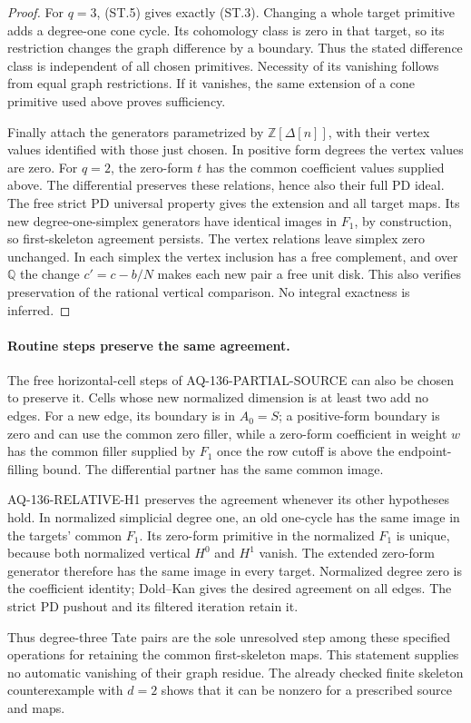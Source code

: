 \begin{proof}
For \(q=3\), (ST.5) gives exactly (ST.3). Changing a whole
target primitive adds a degree-one cone cycle. Its cohomology
class is zero in that target, so its restriction changes the
graph difference by a boundary. Thus the stated difference
class is independent of all chosen primitives. Necessity of
its vanishing follows from equal graph restrictions. If it
vanishes, the same extension of a cone primitive used above
proves sufficiency.

Finally attach the generators parametrized by \(\mathbb Z[\Delta[n]]\),
with their vertex values identified with those just chosen.
In positive form degrees the vertex values are zero. For
\(q=2\), the zero-form \(t\) has the common coefficient
values supplied above. The differential preserves these
relations, hence also their full PD ideal. The free strict PD
universal property gives the extension and all target maps.
Its new degree-one-simplex generators have identical images in
\(F_1\), by construction, so first-skeleton agreement persists.
The vertex relations leave simplex zero unchanged. In each
simplex the vertex inclusion has a free complement, and over
\(\mathbb Q\) the change \(c'=c-b/N\) makes each new pair
a free unit disk. This also verifies preservation of the
rational vertical comparison. No integral exactness is inferred.
\end{proof}

\paragraph{Routine steps preserve the same agreement.}
The free horizontal-cell steps of AQ-136-PARTIAL-SOURCE can
also be chosen to preserve it. Cells whose new normalized
dimension is at least two add no edges. For a new edge, its
boundary is in \(A_0=S\); a positive-form boundary is zero
and can use the common zero filler, while a zero-form coefficient
in weight \(w\) has the common filler supplied by \(F_1\)
once the row cutoff is above the endpoint-filling bound.
The differential partner has the same common image.

AQ-136-RELATIVE-H1 preserves the agreement whenever its other
hypotheses hold. In normalized simplicial degree one, an old
one-cycle has the same image in the targets' common \(F_1\).
Its zero-form primitive in the normalized \(F_1\) is unique,
because both normalized vertical \(H^0\) and \(H^1\) vanish.
The extended zero-form generator therefore has the same image
in every target. Normalized degree zero is the coefficient
identity; Dold--Kan gives the desired agreement on all edges.
The strict PD pushout and its filtered iteration retain it.

Thus degree-three Tate pairs are the sole unresolved step
among these specified operations for retaining the common
first-skeleton maps. This statement supplies no automatic
vanishing of their graph residue. The already checked finite
skeleton counterexample with \(d=2\) shows that it can be
nonzero for a prescribed source and maps.

